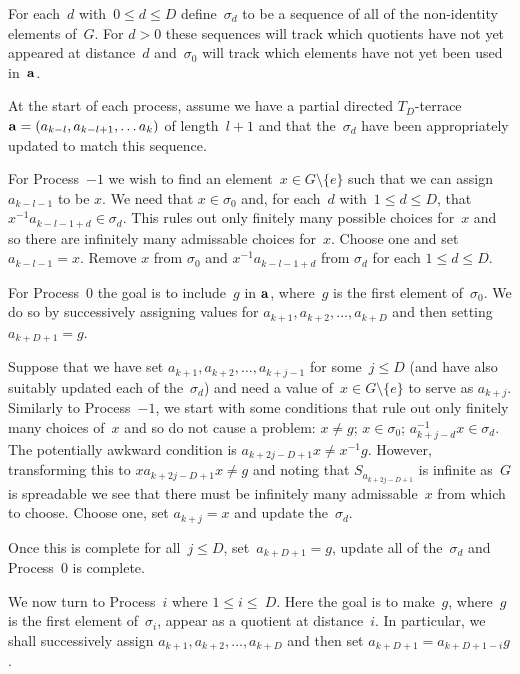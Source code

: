 \documentclass[12pt,a4paper]{article}
\begin{document}
For each~$d$ with~$0 \leq d \leq D$ define~$\sigma_d$ to be a sequence of all of the non-identity elements of~$G$.  For $d>0$ these sequences will track which quotients have not yet appeared at distance~$d$ and~$\sigma_0$ will track which elements have not yet been used in~${\bf a}$.  

At the start of each process, assume we have a partial directed  $T_{D}$-terrace~${\bf a} = (a_{k-l}, a_{k-l+1}, \ldots a_k)$ of length~$l+1$ and that the~$\sigma_d$ have been appropriately updated to match this sequence.

For Process~$-1$ we wish to find an element~$x \in G \setminus \{e\}$ such that we can assign $a_{k-l-1}$ to be $x$.  We need that $x \in \sigma_0$
and, for each~$d$ with~$1 \leq d \leq D$, that $x^{-1}a_{k-l-1+d} \in \sigma_d$.  
This rules out only finitely many possible choices for~$x$ and so there are infinitely many admissable choices for~$x$.  Choose one and set  $a_{k-l-1} = x$.  Remove $x$ from $\sigma_0$ and $x^{-1}a_{k-l-1+d}$ from $\sigma_d$ for each $1 \leq d \leq D$.

For Process~0 the goal is to include~$g$ in ${\bf a}$, where~$g$ is the first element of~$\sigma_0$.  We do so by successively assigning values for $a_{k+1}, a_{k+2}, \ldots, a_{k+D}$ and then setting~$a_{k+D+1} = g$.

Suppose that we have set $a_{k+1}, a_{k+2}, \ldots, a_{k+j-1}$ for some~$j \leq D$ (and have also suitably updated each of the~$\sigma_d$) and need a value of~$x \in G \setminus \{e\}$ to serve as $a_{k+j}$.  Similarly to Process~$-1$, we start with some conditions that rule out only finitely many choices of~$x$ and so do not cause a problem: $ x \neq g$; $x \in \sigma_0$; $a_{k+j-d}^{-1}x \in \sigma_d$.  The potentially awkward condition is  $a_{k+2j-D+1}x \neq   x^{-1}g$.  However, transforming this to $xa_{k+2j-D+1}x \neq g$ and noting that $S_{a_{k+2j-D+1}}$ is infinite as~$G$ is spreadable we see that there must be infinitely many admissable~$x$ from which to choose.  Choose one, set $a_{k+j} = x$ and update the~$\sigma_d$.

Once this is complete for all~$j \leq D$, set~$a_{k+D+1} = g$, update all of the~$\sigma_d$ and Process~0 is complete.

We now turn to Process~$i$ where $1 \leq i \leq~D$.  Here the goal is to make~$g$, where~$g$ is the first element of~$\sigma_i$, appear as a quotient at distance~$i$.  In particular, we shall successively assign $a_{k+1}, a_{k+2}, \ldots, a_{k+D}$ and then set $a_{k+D+1} = a_{k+D+1-i}g$.
\end{document}
